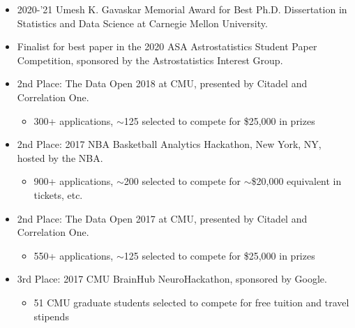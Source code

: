 \documentclass[letterpaper,10pt]{article}
\begin{document}
\begin{itemize}
\item 2020-'21 Umesh K. Gavaskar Memorial Award for Best Ph.D. Dissertation in Statistics and Data Science at Carnegie Mellon University.

\vspace{0.05cm}

\item Finalist for best paper in the 2020 ASA Astrostatistics Student Paper Competition, sponsored by the Astrostatistics Interest Group.

\vspace{0.05cm}

\item 2nd Place: The Data Open 2018 at CMU, presented by Citadel and Correlation One.
\begin{itemize}
\vspace{-0.15cm}
\item 300+ applications, $\sim$125 selected to compete for \$25,000 in prizes
\end{itemize}

\vspace{0.05cm}

\item 2nd Place: 2017 NBA Basketball Analytics Hackathon, New York, NY, hosted by the NBA.
\begin{itemize}
\vspace{-0.15cm}
\item 900+ applications, $\sim$200 selected to compete for $\sim$\$20,000 equivalent in tickets, etc.
\end{itemize}

\vspace{0.05cm}

\item 2nd Place: The Data Open 2017 at CMU, presented by Citadel and Correlation One.
\begin{itemize}
\vspace{-0.15cm}
\item 550+ applications, $\sim$125 selected to compete for \$25,000 in prizes
\end{itemize}

\vspace{0.05cm}

\item 3rd Place: 2017 CMU BrainHub NeuroHackathon, sponsored by Google.
\begin{itemize}
\vspace{-0.15cm}
\item 51 CMU graduate students selected to compete for free tuition and travel stipends
\end{itemize}
\end{itemize}
\end{document}
